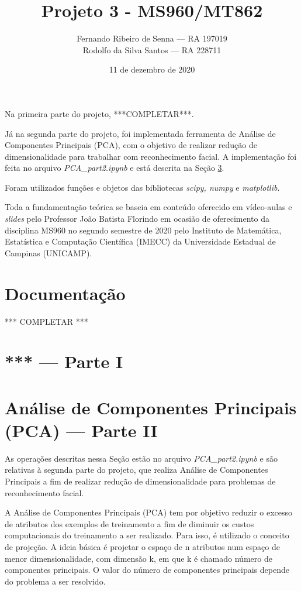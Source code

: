 \documentclass[12pt]{article}
\title{Projeto 3 - MS960/MT862}
\author{Fernando Ribeiro de Senna --- RA 197019\\
Rodolfo da Silva Santos --- RA 228711}
\date{11 de dezembro de 2020}
\begin{document}
\maketitle

Na primeira parte do projeto, ***COMPLETAR***.

Já na segunda parte do projeto, foi implementada ferramenta de Análise de Componentes Principais (PCA), com o objetivo de realizar redução de dimensionalidade para trabalhar com reconhecimento facial. A implementação foi feita no arquivo \textit{PCA\_part2.ipynb} e está descrita na Seção \ref{parte2}.

Foram utilizados funções e objetos das bibliotecas \textit{scipy, numpy} e \textit{matplotlib}. 

Toda a fundamentação teórica se baseia em conteúdo oferecido em vídeo-aulas e \textit{slides} pelo Professor João Batista Florindo em ocasião de oferecimento da disciplina MS960 no segundo semestre de 2020 pelo Instituto de Matemática, Estatística e Computação Científica (IMECC) da Universidade Estadual de Campinas (UNICAMP).


\section{Documentação} \label{doc}
*** COMPLETAR ***



\section{*** --- Parte I} \label{parte1}


\section{Análise de Componentes Principais (PCA) --- Parte II} \label{parte2}
As operações descritas nessa Seção estão no arquivo \textit{PCA\_part2.ipynb} e são relativas à segunda parte do projeto, que realiza Análise de Componentes Principais a fim de realizar redução de dimensionalidade para problemas de reconhecimento facial.

A Análise de Componentes Principais (PCA) tem por objetivo reduzir o excesso de atributos dos exemplos de treinamento a fim de diminuir os custos computacionais do treinamento a ser realizado. Para isso, é utilizado o conceito de projeção. A ideia básica é projetar o espaço de n atributos num espaço de menor dimensionalidade, com dimensão k, em que k é chamado número de componentes principais. O valor do número de componentes principais depende do problema a ser resolvido.
\end{document}
